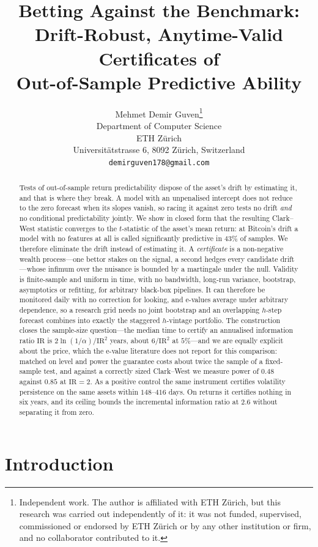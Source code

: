 \documentclass{article}
\title{Betting Against the Benchmark:\\Drift-Robust, Anytime-Valid Certificates of\\Out-of-Sample Predictive Ability}
\author{%
  Mehmet Demir Guven\thanks{%
    Independent work. The author is affiliated with ETH Z\"urich, but this research was
    carried out independently of it: it was not funded, supervised, commissioned or endorsed
    by ETH Z\"urich or by any other institution or firm, and no collaborator contributed to
    it.} \\
  Department of Computer Science \\
  ETH Z\"urich \\
  Universit\"atstrasse 6, 8092 Z\"urich, Switzerland \\
  \texttt{demirguven178@gmail.com} \\
}
\theoremstyle{plain}
\theoremstyle{definition}
\begin{document}
\maketitle

\begin{abstract}
  Tests of out-of-sample return predictability dispose of the asset's drift by estimating it,
  and that is where they break. A model with an unpenalised intercept does not reduce to the
  zero forecast when its slopes vanish, so racing it against zero tests no drift \emph{and} no
  conditional predictability jointly. We show in closed form that the resulting Clark--West
  statistic converges to the $t$-statistic of the asset's mean return: at Bitcoin's drift a
  model with no features at all is called significantly predictive in $43\%$ of samples. We therefore eliminate the drift instead of estimating it. A \emph{certificate} is
  a non-negative wealth process---one bettor stakes on the signal, a second hedges every
  candidate drift---whose infimum over the nuisance is bounded by a martingale under the null. Validity is finite-sample and uniform in time, with no bandwidth, long-run
  variance, bootstrap, asymptotics or refitting, for arbitrary black-box pipelines. It can
  therefore be monitored daily with no correction for looking, and e-values average under
  arbitrary dependence, so a research grid needs no joint bootstrap and an overlapping
  $h$-step forecast combines into exactly the staggered $h$-vintage portfolio. The
  construction closes the sample-size question---the median time to certify an annualised
  information ratio $\mathrm{IR}$ is $2\ln(1/\alpha)/\mathrm{IR}^2$ years, about
  $6/\mathrm{IR}^2$ at $5\%$---and we are equally explicit about the price, which the e-value
  literature does not report for this comparison: matched on level and power the guarantee
  costs about twice the sample of a fixed-sample test, and against a correctly sized
  Clark--West we measure power of $0.48$ against $0.85$ at $\mathrm{IR}=2$. As a positive
  control the same instrument certifies volatility persistence on the same assets within
  $148$--$416$ days. On returns it certifies nothing in six years, and its ceiling bounds the
  incremental information ratio at $2.6$ without separating it from zero.
\end{abstract}

\section{Introduction}
\end{document}
